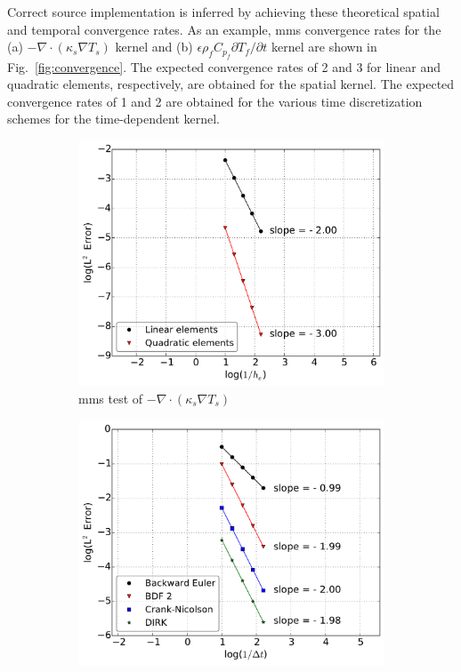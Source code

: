 Correct source implementation is inferred by achieving these theoretical spatial and temporal convergence rates. As an example, \gls{mms} convergence rates for the (a) \(-\nabla\cdot(\kappa_s\nabla T_s)\) kernel and (b) \(\epsilon\rho_fC_{p_f}\partial T_f/\partial t\) kernel are shown in Fig.\ \ref{fig:convergence}. The expected convergence rates of 2 and 3 for linear and quadratic elements, respectively, are obtained for the spatial kernel. The expected convergence rates of 1 and 2 are obtained for the various time discretization schemes for the time-dependent kernel.

\begin{figure}[!h]
\centering
    \begin{subfigure}{0.48\linewidth}
        \centering
        \includegraphics[width=1.0\linewidth]{figs/convergence_solid_energy_diffusion.pdf}
       \caption{\gls{mms} test of \(-\nabla\cdot \left(\kappa_s\nabla T_s\right)\)}
    \end{subfigure}
    \begin{subfigure}{0.48\linewidth}
        \centering
        \includegraphics[width=1.0\linewidth]{figs/convergence_fluid_energy_time.pdf}

\end{subfigure}
\end{figure}
